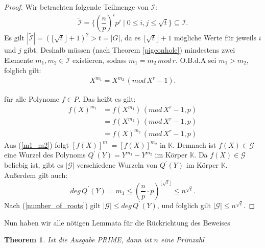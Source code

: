 \documentclass[12pt,oneside]{article}
\newtheorem{theorem}{Theorem}[section]
\theoremstyle{remark}
\theoremstyle{definition}
\begin{document}
\begin{proof}
Wir betrachten folgende Teilmenge von $\mathcal{I}$:
\begin{equation}
    \widetilde{\mathcal{I}} = \{ (\frac{n}{p})^i p^j \mid 0 \leq i,j \leq \sqrt{t}\} \subseteq \mathcal{I}.
\end{equation}
Es gilt $|\widetilde{\mathcal{I}}| = (\lfloor \sqrt{t} \rfloor + 1)^2 > t = |G|$, da es $ \lfloor \sqrt{t} \rfloor + 1$  mögliche Werte für jeweils $i$ und $j$ gibt. Deshalb müssen (nach Theorem \ref{pigeonhole}) mindestens zwei Elemente $m_1,m_2 \in \widetilde{\mathcal{I}}$ existieren, sodass $m_1 = m_2 \, mod \, r$. O.B.d.A sei $m_1 > m_2 $, folglich gilt:\newline
\begin{align*}
    X^{m_1} = X^{m_2} \, (mod \, X^r - 1).
\end{align*}

für alle Polynome $ f \in P$. Das heißt es gilt:\newline
\begin{equation}\label{m1_m2}
    \begin{aligned}
         f(X)^{m_1} &= f(X^{m_1}) \, (mod \, X^r - 1, p) \\
        &= f(X^{m_2}) \, (mod \, X^r - 1,p) \\
        &= f(X)^{m_2} \, (mod \, X^r - 1,p)
    \end{aligned}
\end{equation}
Aus (\ref{m1_m2}) folgt $[f(X)]^{m_1} = [f(X)]^{m_2}$ in $\mathbb{K}$. Demnach ist $f(X) \in  \mathcal{G}$ eine Wurzel des Polynoms $Q^{'}(Y) = Y^{m_1} - Y^{m_2}$ im Körper $\mathbb{K}$. Da $f(X) \in \mathcal{G} $ beliebig ist, gibt es $|\mathcal{G}|$ verschiedene Wurzeln von $Q^{'}(Y)$ im Körper $\mathbb{K}$. Außerdem gilt auch:
\begin{equation}\label{degQ}
    deg \, Q^{'}(Y) = m_1 \leq (\frac{n}{p} \cdot p)^{\lfloor \sqrt{t} \rfloor} \leq n^{\sqrt{t}}. 
\end{equation}
Nach (\ref{number_of_roots}) gilt $|\mathcal{G}| \leq deg \, Q^{'}(Y)$, und folglich gilt $|\mathcal{G}| \leq n^{\sqrt{t}}$.\newline\newline
\end{proof}

Nun haben wir alle nötigen Lemmata für die Rückrichtung des Beweises

\begin{theorem}\label{rueck_rich}
Ist die Ausgabe PRIME, dann ist $n$ eine Primzahl 
\end{theorem}
\end{document}
